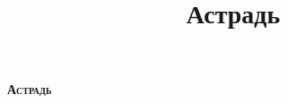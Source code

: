 \documentclass[10pt,a5paper]{article}
\title{Астрадь}
\begin{document}
\begin{titlepage}
	
	\begin{center}
	\vspace*{5 cm}
		{\Huge \bfseries \scshape Астрадь}
	\end{center}
\end{titlepage}

\tableofcontents
\newpage



\end{document}
